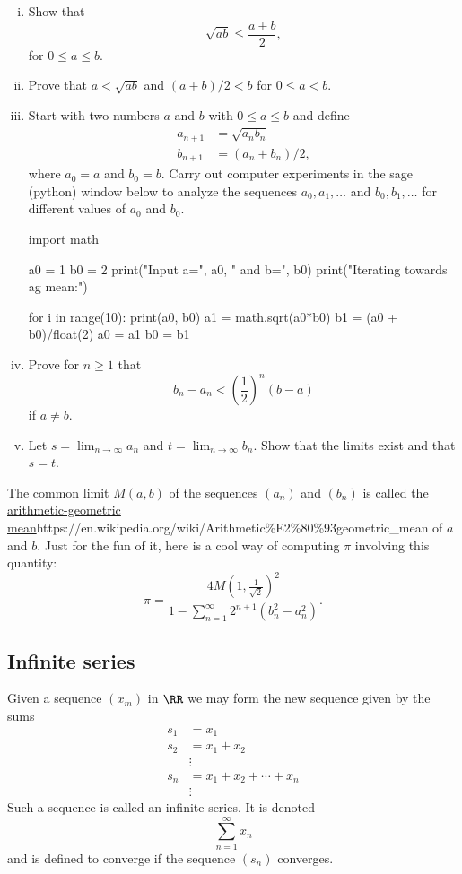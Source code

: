 \documentclass{article}
\begin{document}
\beginshex
\begin{enumerate}[(i)]
\item Show that
  $$
  \sqrt{a b} \leq \frac{a+b}{2},
  $$
  for $0\leq a \leq b$.
\item
  Prove that $a < \sqrt{a b}$ and $(a+b)/2 < b$ for $0\leq a < b$.
\item
  Start with two numbers $a$ and $b$ with $0\leq a\leq b$ and define
  \begin{align*}
    a_{n+1} &= \sqrt{a_n b_n}\\
    b_ {n+1} &= (a_n + b_n)/2,
  \end{align*}
  where $a_0 = a$ and $b_0 = b$. Carry out computer experiments in the sage (python) window below
  to analyze the sequences $a_0, a_1, \dots$ and $b_0, b_1, \dots$
  for different values of $a_0$ and $b_0$.


\begin{sage}
import math

a0 = 1
b0 = 2
print("Input a=", a0, " and b=", b0)
print("Iterating towards ag mean:")
  
for i in range(10):
  print(a0, b0)
  a1 = math.sqrt(a0*b0)
  b1 = (a0 + b0)/float(2)
  a0 = a1
  b0 = b1
\end{sage}
\item
  Prove for $n\geq 1$ that
  $$
  b_n - a_n < \left(\frac{1}{2}\right)^n (b-a)
  $$
  if $a\neq b$.
\item
  Let $s = \lim_{n\to \infty} a_n$ and $t=\lim_{n\to \infty} b_n$.
  Show that the limits exist and that $s = t$.
\end{enumerate}
The common limit $M(a, b)$ of the sequences $(a_n)$ and
$(b_n)$ is called the \url{arithmetic-geometric mean}{https://en.wikipedia.org/wiki/Arithmetic\%E2\%80\%93geometric_mean} of $a$ and $b$.
Just for the fun of it, here is a cool way of computing $\pi$
involving this quantity:
$$
\pi = \frac{4 M(1, \frac{1}{\sqrt{2}})^2}{1 - \sum_{n=1}^\infty 2^ {n+1}(b_n^2 - a_n^2)}.
$$
\endshex


\subsection{Infinite series}

Given a sequence $(x_m)$ in $\RR$ we may form the new sequence given by the sums
\begin{align*}
  s_1 &= x_1\\
  s_2 &= x_1 + x_2\\
      &\vdots\\
  s_n &= x_1 + x_2 + \cdots + x_n\\
  &\vdots       
\end{align*}
Such a sequence is called an infinite series. It is denoted
$$
\sum_{n=1}^\infty x_n
$$
and is defined to converge if the sequence $(s_n)$ converges.
\end{document}
